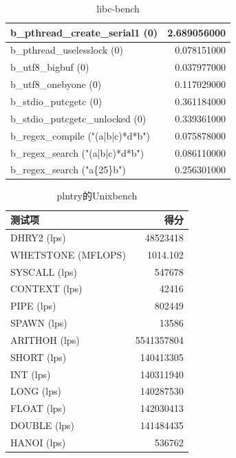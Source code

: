 \begin{table}
\begin{tabular}{|l|r|}
        \hline
        b\_pthread\_create\_serial1 (0) & 2.689056000 \\
        \hline
        b\_pthread\_uselesslock (0) & 0.078151000 \\
        \hline
        b\_utf8\_bigbuf (0) & 0.037977000 \\
        \hline
        b\_utf8\_onebyone (0) & 0.117029000 \\
        \hline
        b\_stdio\_putcgetc (0) & 0.361184000 \\
        \hline
        b\_stdio\_putcgetc\_unlocked (0) & 0.339361000 \\
        \hline
        b\_regex\_compile ("(a|b|c)*d*b") & 0.075878000 \\
        \hline
        b\_regex\_search ("(a|b|c)*d*b") & 0.086110000 \\
        \hline
        b\_regex\_search ("a\{25\}b") & 0.256301000 \\
        \hline
    \end{tabular}
    \caption{libc-bench}
\end{table}

\begin{table}[h]
    \centering
    \begin{tabular}{|l|r|}
    \hline
        测试项 & 得分 \\
        \hline
        DHRY2 (lps) & 48523418 \\
        \hline
        WHETSTONE (MFLOPS) & 1014.102 \\
        \hline
        SYSCALL (lps) & 547678 \\
        \hline
        CONTEXT (lps) & 42416 \\
        \hline
        PIPE (lps) & 802449 \\
        \hline
        SPAWN (lps) & 13586 \\
        \hline
        ARITHOH (lps) & 5541357804 \\
        \hline
        SHORT (lps) & 140413305 \\
        \hline
        INT (lps) & 140311940 \\
        \hline
        LONG (lps) & 140287530 \\
        \hline
        FLOAT (lps) & 142030413 \\
        \hline
        DOUBLE (lps) & 141484435 \\
        \hline
        HANOI (lps) & 536762 \\
    \hline
    \end{tabular}
    \caption{plntry的Unixbench}
    \label{tab:unixbench}
\end{table}

